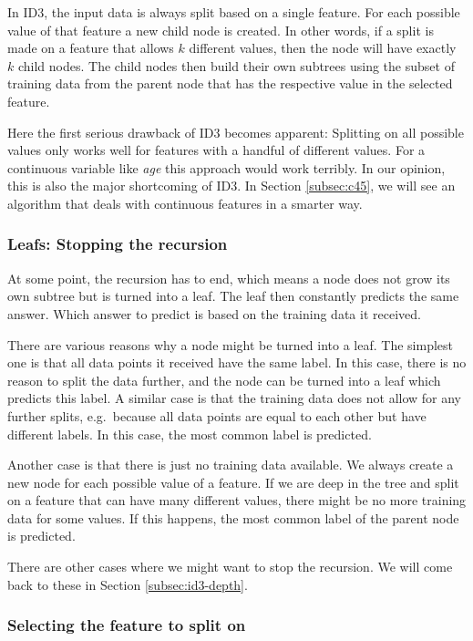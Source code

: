 \documentclass[a4paper]{article}
\begin{document}
In ID3, the input data is always split based on a single feature. For each possible value of that feature a new child node is created.
In other words, if a split is made on a feature that allows $k$ different values, then the node will have exactly $k$ child nodes.
The child nodes then build their own subtrees using the subset of training data from the parent node that has the respective value in the selected feature.

Here the first serious drawback of ID3 becomes apparent: Splitting on all possible values only works well for features with a handful of different values. For a continuous variable like \emph{age} this approach would work terribly. In our opinion, this is also the major shortcoming of ID3. In Section \ref{subsec:c45}, we will see an algorithm that deals with continuous features in a smarter way.

\subsubsection{Leafs: Stopping the recursion}

At some point, the recursion has to end, which means a node does not grow its own subtree but is turned into a leaf. The leaf then constantly predicts the same answer. Which answer to predict is based on the training data it received.

There are various reasons why a node might be turned into a leaf. The simplest one is that all data points it received have the same label. In this case, there is no reason to split the data further, and the node can be turned into a leaf which predicts this label. A similar case is that the training data does not allow for any further splits, e.g.\ because all data points are equal to each other but have different labels. In this case, the most common label is predicted.

Another case is that there is just no training data available. We always create a new node for each possible value of a feature. If we are deep in the tree and split on a feature that can have many different values, there might be no more training data for some values. If this happens, the most common label of the parent node is predicted.

There are other cases where we might want to stop the recursion. We will come back to these in Section \ref{subsec:id3-depth}.

\subsubsection{Selecting the feature to split on}
\end{document}
